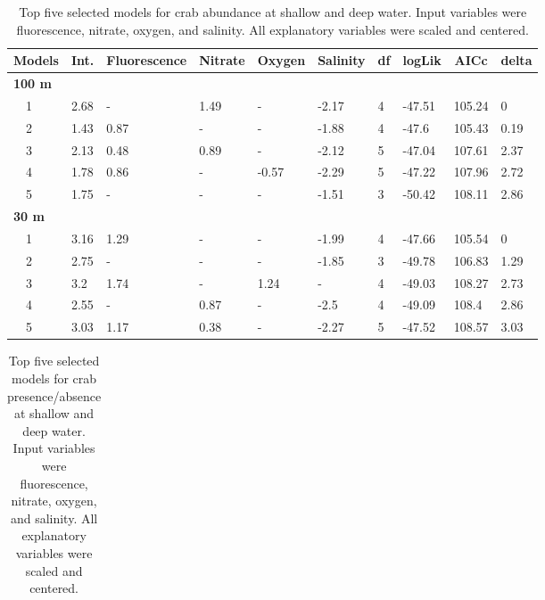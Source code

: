 \documentclass[letterpaper,12pt]{article}\usepackage[]{graphicx}\usepackage[]{color}
\begin{document}
\begin{landscape}
\centering\vspace*{\fill}
\begin{table}[!tbp]
{\scriptsize
\caption{Top five selected models for crab abundance at shallow and deep water. Input variables were fluorescence, nitrate, oxygen, and salinity. All explanatory variables were scaled and centered.\label{tab:abutab}} 
\begin{center}
\begin{tabular}{llllllllll}
\hline\hline
\multicolumn{1}{l}{Models}&\multicolumn{1}{c}{Int.}&\multicolumn{1}{c}{Fluorescence}&\multicolumn{1}{c}{Nitrate}&\multicolumn{1}{c}{Oxygen}&\multicolumn{1}{c}{Salinity}&\multicolumn{1}{c}{df}&\multicolumn{1}{c}{logLik}&\multicolumn{1}{c}{AICc}&\multicolumn{1}{c}{delta}\tabularnewline
\hline
{\bfseries 100 m}&&&&&&&&&\tabularnewline
~~1&2.68&-&1.49&-&-2.17&4&-47.51&105.24&0\tabularnewline
~~2&1.43&0.87&-&-&-1.88&4&-47.6&105.43&0.19\tabularnewline
~~3&2.13&0.48&0.89&-&-2.12&5&-47.04&107.61&2.37\tabularnewline
~~4&1.78&0.86&-&-0.57&-2.29&5&-47.22&107.96&2.72\tabularnewline
~~5&1.75&-&-&-&-1.51&3&-50.42&108.11&2.86\tabularnewline
\hline
{\bfseries 30 m}&&&&&&&&&\tabularnewline
~~1&3.16&1.29&-&-&-1.99&4&-47.66&105.54&0\tabularnewline
~~2&2.75&-&-&-&-1.85&3&-49.78&106.83&1.29\tabularnewline
~~3&3.2&1.74&-&1.24&-&4&-49.03&108.27&2.73\tabularnewline
~~4&2.55&-&0.87&-&-2.5&4&-49.09&108.4&2.86\tabularnewline
~~5&3.03&1.17&0.38&-&-2.27&5&-47.52&108.57&3.03\tabularnewline
\hline
\end{tabular}\end{center}}
\end{table}
\begin{table}[!tbp]
{\scriptsize
\caption{Top five selected models for crab presence/absence at shallow and deep water. Input variables were fluorescence, nitrate, oxygen, and salinity. All explanatory variables were scaled and centered.\label{tab:patab}} 
\begin{center}
\begin{tabular}{llllllllll}

\end{tabular}
\end{center}}
\end{table}
\end{landscape}
\end{document}
